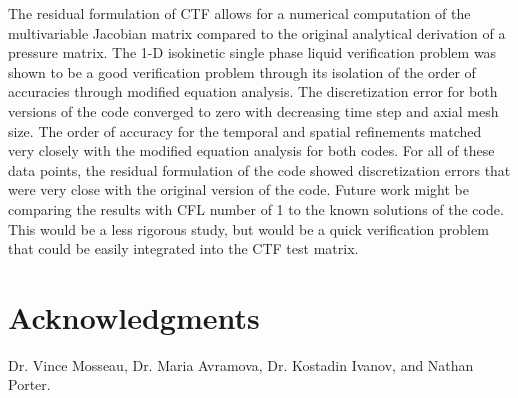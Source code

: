 \documentclass{mc2015}
\begin{document}
The residual formulation of CTF allows for a numerical computation of the
multivariable Jacobian matrix compared to the original analytical derivation of
a pressure matrix. The 1-D isokinetic single phase liquid verification problem
was shown to be a good verification problem through its isolation of the order
of accuracies through modified equation analysis. The discretization error for
both versions of the code converged to zero with decreasing time step and axial
mesh size. The order of accuracy for the temporal and spatial refinements
matched very closely with the modified equation analysis for both codes. For all
of these data points, the residual formulation of the code showed discretization
errors that were very close with the original version of the code. Future work
might be comparing the results with CFL number of 1 to the known solutions of
the code. This would be a less rigorous study, but would be a quick verification
problem that could be easily integrated into the CTF test matrix. 

\section{Acknowledgments}

Dr. Vince Mosseau, Dr. Maria Avramova, Dr. Kostadin Ivanov, and Nathan Porter.

\setlength{\baselineskip}{12pt}





\end{document}
